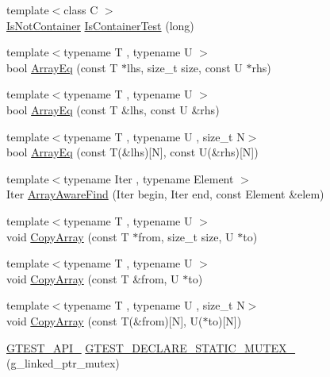 \begin{DoxyCompactItemize}
{\footnotesize template$<$class C $>$ }\\\mbox{\hyperlink{namespacetesting_1_1internal_abf080521ce135deb510e0a7830fd3d33}{Is\+Not\+Container}} \mbox{\hyperlink{namespacetesting_1_1internal_af545a2ae928b8a9e7581978234464275}{Is\+Container\+Test}} (long)
\item 
{\footnotesize template$<$typename T , typename U $>$ }\\bool \mbox{\hyperlink{namespacetesting_1_1internal_af4bebf36baf0b0a5b26d051dde55fa47}{Array\+Eq}} (const T $\ast$lhs, size\+\_\+t size, const U $\ast$rhs)
\item 
{\footnotesize template$<$typename T , typename U $>$ }\\bool \mbox{\hyperlink{namespacetesting_1_1internal_a49b4d0ee49c0f8c93bab29ebd20630cc}{Array\+Eq}} (const T \&lhs, const U \&rhs)
\item 
{\footnotesize template$<$typename T , typename U , size\+\_\+t N$>$ }\\bool \mbox{\hyperlink{namespacetesting_1_1internal_a5cb6f81ee827130024261121c742b26c}{Array\+Eq}} (const T(\&lhs)\mbox{[}N\mbox{]}, const U(\&rhs)\mbox{[}N\mbox{]})
\item 
{\footnotesize template$<$typename Iter , typename Element $>$ }\\Iter \mbox{\hyperlink{namespacetesting_1_1internal_a94a857fe6ff32cf4fdc4769a4071f239}{Array\+Aware\+Find}} (Iter begin, Iter end, const Element \&elem)
\item 
{\footnotesize template$<$typename T , typename U $>$ }\\void \mbox{\hyperlink{namespacetesting_1_1internal_afb1b9728aaaf6d9fe6246a19cfe3f7f5}{Copy\+Array}} (const T $\ast$from, size\+\_\+t size, U $\ast$to)
\item 
{\footnotesize template$<$typename T , typename U $>$ }\\void \mbox{\hyperlink{namespacetesting_1_1internal_a84d0e746ba0827cc52b53d22000de0e8}{Copy\+Array}} (const T \&from, U $\ast$to)
\item 
{\footnotesize template$<$typename T , typename U , size\+\_\+t N$>$ }\\void \mbox{\hyperlink{namespacetesting_1_1internal_a1e7ae855686720615dcd5754c8181c62}{Copy\+Array}} (const T(\&from)\mbox{[}N\mbox{]}, U($\ast$to)\mbox{[}N\mbox{]})
\item 
\mbox{\hyperlink{gtest-port_8h_aa73be6f0ba4a7456180a94904ce17790}{G\+T\+E\+S\+T\+\_\+\+A\+P\+I\+\_\+}} \mbox{\hyperlink{namespacetesting_1_1internal_ad7c5625384cf5f6b714188f274537ef6}{G\+T\+E\+S\+T\+\_\+\+D\+E\+C\+L\+A\+R\+E\+\_\+\+S\+T\+A\+T\+I\+C\+\_\+\+M\+U\+T\+E\+X\+\_\+}} (g\+\_\+linked\+\_\+ptr\+\_\+mutex)

\end{DoxyCompactItemize}
